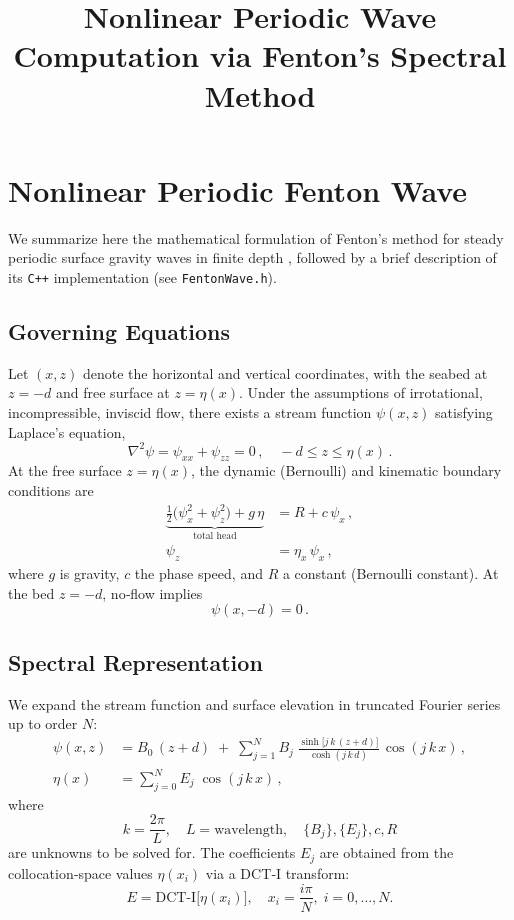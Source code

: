 \documentclass{article}
\title{Nonlinear Periodic Wave Computation via Fenton’s Spectral Method}
\author{}
\date{}
\begin{document}
\maketitle

\section{Nonlinear Periodic Fenton Wave}
\label{sec:fenton_method}

\noindent
We summarize here the mathematical formulation of Fenton’s method for steady periodic surface gravity waves in finite depth \cite{Fenton1988}, followed by a brief description of its \verb|C++| implementation (see \texttt{FentonWave.h}).

\subsection{Governing Equations}

Let $(x,z)$ denote the horizontal and vertical coordinates, with the seabed at $z=-d$ and free surface at $z=\eta(x)$. Under the assumptions of irrotational, incompressible, inviscid flow, there exists a stream function $\psi(x,z)$ satisfying Laplace’s equation,
\begin{equation}
\nabla^2 \psi = \psi_{xx} + \psi_{zz} = 0\,, \quad -d \le z \le \eta(x)\,.
\end{equation}
At the free surface $z=\eta(x)$, the dynamic (Bernoulli) and kinematic boundary conditions are
\begin{align}
\underbrace{\tfrac12\bigl(\psi_x^2 + \psi_z^2\bigr) + g\,\eta}_{\text{total head}}
  &= R + c\,\psi_x\,, 
  \label{eq:bernoulli}\\
\psi_z &= \eta_x\,\psi_x\,,
  \label{eq:kinematic}
\end{align}
where $g$ is gravity, $c$ the phase speed, and $R$ a constant (Bernoulli constant). At the bed $z=-d$, no‐flow implies
\begin{equation}
\psi(x,-d)=0\,.
\end{equation}

\subsection{Spectral Representation}

We expand the stream function and surface elevation in truncated Fourier series up to order $N$:
\begin{align}
\psi(x,z) &= B_0\,(z + d)
   \;+\;\sum_{j=1}^{N} B_j\;\frac{\sinh\!\bigl[j\,k\,(z + d)\bigr]}{\cosh(j\,k\,d)}
   \,\cos(j\,k\,x)\,,
   \label{eq:psi_series}\\
\eta(x) &= \sum_{j=0}^{N} E_j\;\cos(j\,k\,x)\,,
   \label{eq:eta_series}
\end{align}
where
\[
k = \frac{2\pi}{L}, 
\quad L = \text{wavelength}, 
\quad \{B_j\},\{E_j\},c,R
\]
are unknowns to be solved for. The coefficients $E_j$ are obtained from the collocation‐space values $\eta(x_i)$ via a DCT‐I transform:
\[
E = \mathrm{DCT\text{-}I}\bigl[\eta(x_i)\bigr], 
\quad x_i = \frac{i\pi}{N},\; i=0,\dots,N.
\]
\end{document}
